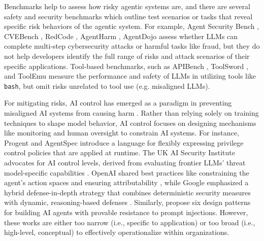 \documentclass{article}
\begin{document}
Benchmarks help to assess how risky agentic systems are, and there are several safety and security benchmarks which outline test scenarios or tasks that reveal specific risk behaviors of the agentic system. For example, Agent Security Bench \citep{zhang2025agentsecuritybenchasb}, CVEBench \citep{zhu2025cvebenchbenchmarkaiagents}, RedCode \citep{guo2024_redcode}, AgentHarm \citep{andriushchenko2025agentharmbenchmarkmeasuringharmfulness}, AgentDojo \citep{debenedetti2024agentdojodynamicenvironmentevaluate} assess whether LLMs can complete multi-step cybersecurity attacks or harmful tasks like fraud, but they do not help developers identify the full range of risks and attack scenarios of their specific applications. Tool-based benchmarks, such as APIBench \citep{patil2023gorillalargelanguagemodel}, ToolSword \citep{ye2024toolswordunveilingsafetyissues}, and ToolEmu \citep{ruan2024identifyingriskslmagents} measure the performance and safety of LLMs in utilizing tools like \texttt{bash}, but omit risks unrelated to tool use (e.g. misaligned LLMs).

For mitigating risks, AI control has emerged as a paradigm in preventing misaligned AI systems from causing harm \citep{greenblatt2024aicontrolimprovingsafety}. Rather than relying solely on training techniques to shape model behavior, AI control focuses on designing mechanisms like monitoring and human oversight to constrain AI systems. For instance, Progent \citep{shi2025progentprogrammableprivilegecontrol} and AgentSpec \citep{wang2025agentspeccustomizableruntimeenforcement} introduce a language for flexibly expressing privilege control policies that are applied at runtime. The UK AI Security Institute advocates for AI control levels, derived from evaluating frontier LLMs' threat model-specific capabilities \citep{korbak2025evaluatecontrolmeasuresllm}. OpenAI shared best practices like constraining the agent's action spaces and ensuring attributability \citep{openai_practices_governing_agentic}, while Google emphasized a hybrid defense-in-depth strategy that combines deterministic security measures with dynamic, reasoning-based defenses \citep{google_approach_secure_ai_agents}. Similarly, \citet{beurerkellner2025designpatternssecuringllm} propose six design patterns for building AI agents with provable resistance to prompt injections. However, these works are either too narrow (i.e., specific to application) or too broad (i.e., high-level, conceptual) to effectively operationalize within organizations. 

\end{document}
